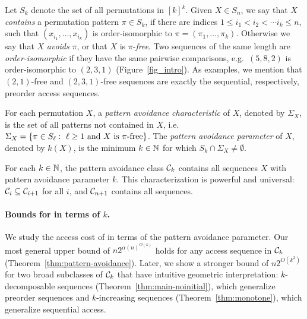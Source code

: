 Let $S_k$ denote the set of all permutations in $[k]^k$.  
Given $X \in S_n$, we say that $X$ \emph{contains} a permutation pattern $\pi \in S_k$, if there are indices $1 \leq i_1 < i_2 < \cdots i_k \leq n$, such that $(x_{i_1}, \dots, x_{i_k})$ is order-isomorphic to $\pi = (\pi_1, \dots, \pi_k)$. 
Otherwise we say that $X$ \emph{avoids} $\pi$, or that $X$ is $\pi$-\emph{free}. 
Two sequences of the same length are \emph{order-isomorphic} if they have the same pairwise comparisons, e.g.\ $(5,8,2)$ is order-isomorphic to $(2,3,1)$ (Figure~\ref{fig_intro}). As examples, we mention that $(2,1)$-free and $(2,3,1)$-free sequences are exactly the sequential, respectively, preorder access sequences.

For each permutation $X$, a {\em pattern avoidance characteristic} of $X$, denoted by $\Sigma_X$, is the set of all patterns not contained in $X$, i.e.\ $\Sigma_X = \left\{ \pi \in S_{\ell}:  \mbox{ $\ell \geq 1$ and $X$ is $\pi$-free} \right\}$. 
The {\em pattern avoidance parameter} of $X$, denoted by $k(X)$, is the minimum $k \in \mathbb N$ for which $S_k \cap \Sigma_X \neq \emptyset$.  

For each $k \in \mathbb N$, the pattern avoidance class ${\mathcal{C}}_k$ contains all sequences $X$ with pattern avoidance parameter $k$.  
This characterization is powerful and universal: ${\mathcal{C}}_i \subseteq {\mathcal{C}}_{i+1}$ for all $i$, and ${\mathcal{C}}_{n+1}$ contains all sequences. %

\paragraph{Bounds for \greedy in terms of $k$.} 
We study the access cost of \greedy in terms of the pattern avoidance parameter. 
Our most general upper bound of $n 2^{\alpha(n)^{O(k)}}$ holds for any access sequence in ${\mathcal{C}}_k$ (Theorem~\ref{thm:pattern-avoidance}). %
Later, we show a stronger bound of $n2^{O(k^2)}$ for two broad subclasses of ${\mathcal{C}}_k$ that have intuitive geometric interpretation: $k$-decomposable sequences (Theorem~\ref{thm:main-noinitial}), which generalize preorder sequences and $k$-increasing sequences (Theorem~\ref{thm:monotone}), which generalize sequential access.   

